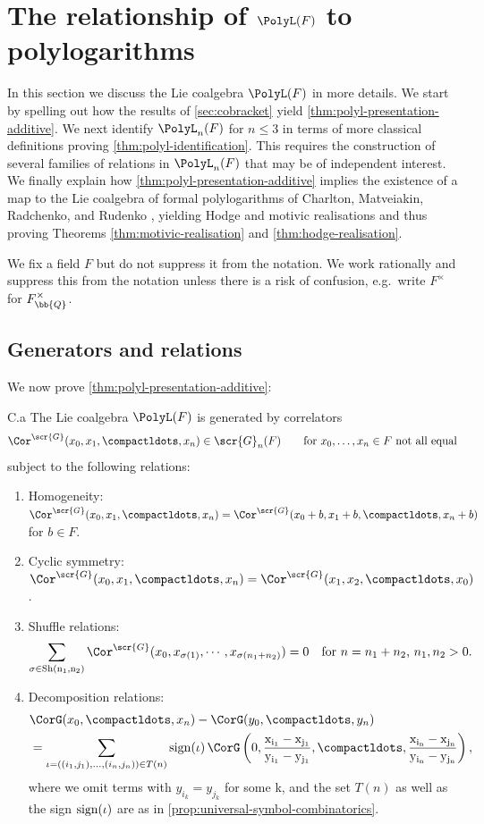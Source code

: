 \documentclass[a4paper]{amsart}
\begin{document}
\section{The relationship of $\PolyL(F)$ to polylogarithms}
In this section we discuss the Lie coalgebra $\PolyL(F)$ in more details. We start by spelling out how the results of \cref{sec:cobracket} yield \cref{thm:polyl-presentation-additive}. We next identify $\PolyL_n(F)$ for $n \leq 3$ in terms of more classical definitions proving \cref{thm:polyl-identification}. This requires the construction of several families of relations in $\PolyL_n(F)$ that may be of independent interest. We finally explain how \cref{thm:polyl-presentation-additive} implies the existence of a map to the Lie coalgebra of formal polylogarithms of Charlton, Matveiakin, Radchenko, and Rudenko \cite{CMRR24}, yielding Hodge and motivic realisations and thus proving Theorems \ref{thm:motivic-realisation} and \ref{thm:hodge-realisation}.

\begin{convention}\label{conv:less-short} We fix a field $F$ but do not suppress it from the notation. We work rationally and suppress this from the notation unless there is a risk of confusion, e.g.~write $F^\times$ for $F^\times_\bb{Q}$.
\end{convention}

\subsection{Generators and relations}
We now prove \cref{thm:polyl-presentation-additive}: 

\begin{customthm}{C.a} 
The Lie coalgebra $\PolyL(F)$ is generated by correlators 
    \[\Cor^\scr{G}(x_0,x_1,\compactldots,x_n) \in \scr{G}_n(F) \qquad \text{for $x_0,\ldots,x_n \in F$ not all equal}\]  
    subject to the following relations:
    \begin{enumerate}[\noindent (1)]
\item  Homogeneity: $\Cor^\scr{G}(x_0,x_1,\compactldots,x_n)=\Cor^\scr{G}(x_0+b,x_1+b,\compactldots,x_n+b)$ for $b\in F$.
\item  Cyclic symmetry: $\Cor^\scr{G}(x_0,x_1,\compactldots,x_n)=\Cor^\scr{G}(x_1,x_2,\compactldots,x_0)$.
\item Shuffle relations: 
\[\sum_{\sigma \in \rm{Sh}(n_1,n_2)} \Cor^\scr{G}(x_0,x_{\sigma(1)},\cdots,x_{\sigma(n_1+n_2)}) =0 \quad 
\text{for $n=n_1+n_2$, $n_1,n_2>0$.}\]
\item Decomposition relations:
\begin{align*}
    &\CorG(x_0,\compactldots,x_n)-\CorG(y_0,\compactldots,y_n)\\
     &=\sum_{\iota=((i_1,j_1),\dots,(i_{n},j_n))\in T(n)}\rm{sign}(\iota)\,
     \CorG\left(0,\frac{x_{i_1}-x_{j_1}}{y_{i_1}-y_{j_1}},\compactldots,\frac{x_{i_n}-x_{j_n}}{y_{i_n}-y_{j_n}}\right),
\end{align*}
where we omit terms with $y_{i_k}=y_{j_k}$ for some k, and the set $T(n)$ as well as the sign $\rm{sign}(\iota)$ are as in \cref{prop:universal-symbol-combinatorics}.
\end{enumerate}
\end{customthm}
\end{document}

